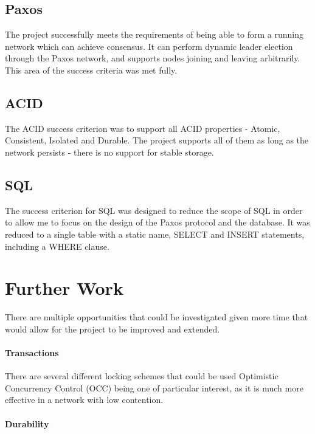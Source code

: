\documentclass[12pt,twoside,notitlepage]{report}
\begin{document}
\subsection{Paxos}

The project successfully meets the requirements of being able to form a running network which can
achieve consensus. It can perform dynamic leader election through the Paxos network, and
supports nodes joining and leaving arbitrarily. This area of the success criteria was met fully.

\subsection{ACID}

The ACID success criterion was to support all ACID properties - Atomic, Consistent, Isolated and
Durable. The project supports all of them as long as the network persists - there is no support
for stable storage.

\subsection{SQL}

The success criterion for SQL was designed to reduce the scope of SQL in order to allow me to
focus on the design of the Paxos protocol and the database. It was reduced to a single table with
a static name, SELECT and INSERT statements, including a WHERE clause.

\section{Further Work}

There are multiple opportunities that could be investigated given more time that would allow for
the project to be improved and extended.

\paragraph{Transactions}

There are several different locking schemes that could be used Optimistic Concurrency Control
(OCC) being one of particular interest, as it is much more effective in a network with low
contention.

\paragraph{Durability}
\end{document}

